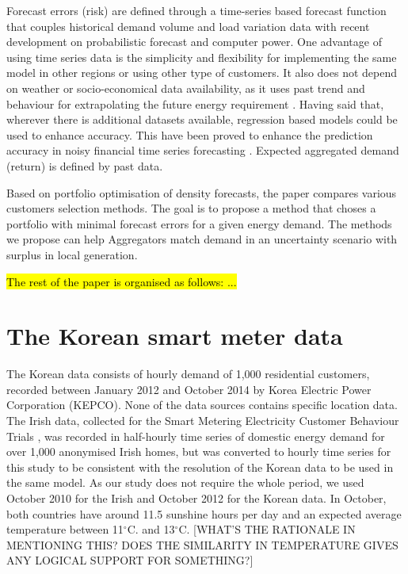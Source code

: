 \documentclass[preprint,3p,12pt,authoryear]{elsarticle}
\begin{document}
Forecast errors (risk) are defined through a time-series based forecast function that couples historical demand volume and load variation data with recent development on probabilistic forecast and computer power.
One advantage of using time series data is the simplicity and flexibility for implementing the same model in other regions or using other type of customers.
It also does not depend on weather or socio-economical data availability, as it uses past trend and behaviour for extrapolating the future energy requirement \citep{forecasting_general_review}.
Having said that, wherever there is additional datasets available, regression based models could be used to enhance accuracy.
This have been proved to enhance the prediction accuracy in noisy financial time series forecasting \citep{TAY2001309}.
Expected aggregated demand (return) is defined by past data.

Based on portfolio optimisation of density forecasts, the paper compares various customers selection methods.
The goal is to propose a method that choses a portfolio with minimal forecast errors for a given energy demand.
The methods we propose can help Aggregators match demand in an uncertainty scenario with surplus in local generation.

\hl{The rest of the paper is organised as follows: ...}

\section{The Korean smart meter data}
\label{sec:smdata}

The Korean data consists of hourly demand of 1,000 residential customers, recorded between January 2012 and October 2014 by Korea Electric Power Corporation (KEPCO). None of the data sources contains specific location data. The Irish data, collected for the Smart Metering Electricity Customer Behaviour Trials \citep{irish_data}, was recorded in half-hourly time series of domestic energy demand for over 1,000 anonymised Irish homes, but was converted to hourly time series for this study to be consistent with the resolution of the Korean data to be used in the same model. As our study does not require the whole period, we used October 2010 for the Irish and October 2012 for the Korean data. In October, both countries have around 11.5 sunshine hours per day and an expected average temperature between 11$^{\circ}$C. and 13$^{\circ}$C. [WHAT'S THE RATIONALE IN MENTIONING THIS? DOES THE SIMILARITY IN TEMPERATURE GIVES ANY LOGICAL SUPPORT FOR SOMETHING?]
\end{document}
